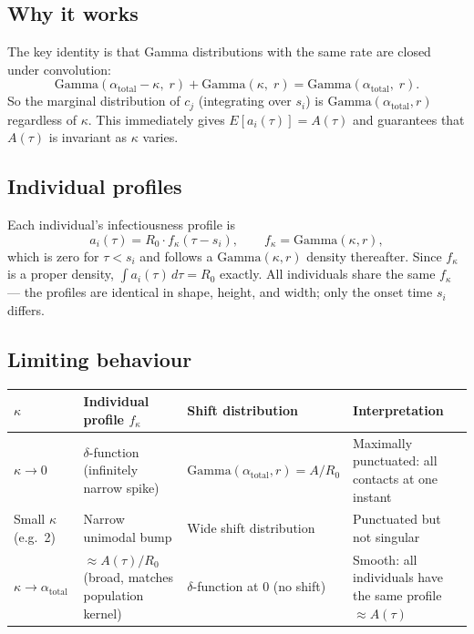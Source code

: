 \documentclass[11pt]{article}
\begin{document}
\subsection{Why it works}

The key identity is that Gamma distributions with the same rate are closed under convolution:
\[
\text{Gamma}(\alpha_{\text{total}} - \kappa,\; r) + \text{Gamma}(\kappa,\; r) = \text{Gamma}(\alpha_{\text{total}},\; r).
\]
So the marginal distribution of $c_j$ (integrating over $s_i$) is $\text{Gamma}(\alpha_{\text{total}}, r)$ regardless of $\kappa$. This immediately gives $E[a_i(\tau)] = A(\tau)$ and guarantees that $A(\tau)$ is invariant as $\kappa$ varies.

\subsection{Individual profiles}

Each individual's infectiousness profile is
\[
a_i(\tau) = R_0 \cdot f_\kappa(\tau - s_i), \qquad f_\kappa = \text{Gamma}(\kappa, r),
\]
which is zero for $\tau < s_i$ and follows a $\text{Gamma}(\kappa, r)$ density thereafter. Since $f_\kappa$ is a proper density, $\int a_i(\tau)\,d\tau = R_0$ exactly. All individuals share the same $f_\kappa$ --- the profiles are identical in shape, height, and width; only the onset time $s_i$ differs.

\subsection{Limiting behaviour}

\medskip
{\small
\begin{tabular}{llll}
\toprule
$\kappa$ & Individual profile $f_\kappa$ & Shift distribution & Interpretation \\
\midrule
$\kappa \to 0$ & $\delta$-function (infinitely narrow spike) & $\text{Gamma}(\alpha_{\text{total}}, r) = A/R_0$ & Maximally punctuated: all contacts at one instant \\
Small $\kappa$ (e.g.\ 2) & Narrow unimodal bump & Wide shift distribution & Punctuated but not singular \\
$\kappa \to \alpha_{\text{total}}$ & $\approx A(\tau)/R_0$ (broad, matches population kernel) & $\delta$-function at 0 (no shift) & Smooth: all individuals have the same profile $\approx A(\tau)$ \\
\bottomrule
\end{tabular}
}
\medskip
\end{document}
